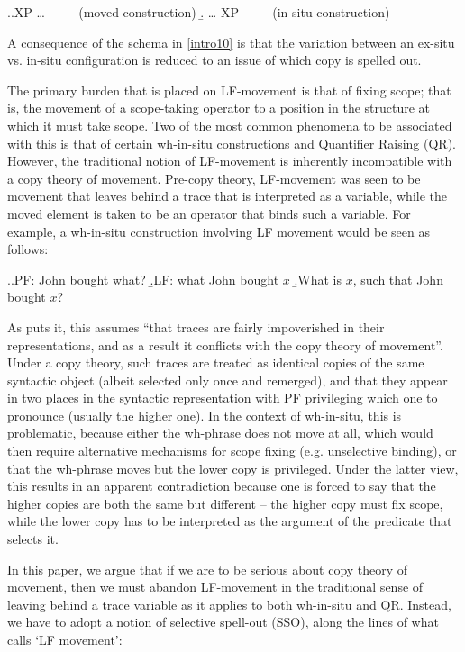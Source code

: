 \documentclass[charis]{glossa}
\begin{document}
\ex.\label{intro10}\a.XP {\dots}  $\qquad$ (moved construction)
    \b. {\dots} XP $\qquad$ (in-situ construction)

A consequence of the schema in \ref{intro10} is that the variation between an ex-situ vs. in-situ configuration is reduced to an issue of which copy is spelled out.

The primary burden that is placed on LF-movement is that of fixing scope; that is, the movement of a scope-taking operator to a position in the structure at which it must take scope. Two of the most common phenomena to be associated with this is that of certain wh-in-situ constructions and Quantifier Raising (QR). However, the traditional notion of LF-movement is inherently incompatible with a copy theory of movement. Pre-copy theory, LF-movement was seen to be movement that leaves behind a trace that is interpreted as a variable, while the moved element is taken to be an operator that binds such a variable. For example, a wh-in-situ construction involving LF movement would be seen as follows:

\ex.\label{intro20}\a.PF: John bought what?
   \b.LF: what John bought $x$
   \b.What is $x$, such that John bought $x$?

As \cite{fox:2002} puts it, this assumes ``that traces are fairly impoverished in their representations, and as a result it conflicts with the copy theory of movement''. Under a copy theory, such traces are treated as identical copies of the same syntactic object (albeit selected only once and remerged), and that they appear in two places in the syntactic representation with PF privileging which one to pronounce (usually the higher one). In the context of wh-in-situ, this is problematic, because either the wh-phrase does not move at all, which would then require alternative mechanisms for scope fixing (e.g. unselective binding), or that the wh-phrase moves but the lower copy is privileged. Under the latter view, this results in an apparent contradiction because one is forced to say that the higher copies are both the same but different -- the higher copy must fix scope, while the lower copy has to be interpreted as the argument of the predicate that selects it.

In this paper, we argue that if we are to be serious about copy theory of movement, then we must abandon LF-movement in the traditional sense of leaving behind a trace variable as it applies to both wh-in-situ and QR. Instead, we have to adopt a notion of selective spell-out (SSO), along the lines of what \cite{bobaljik:2002} calls `LF movement':
\end{document}
